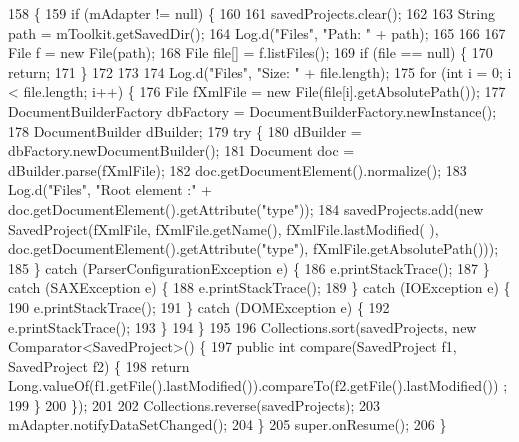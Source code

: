 \begin{DoxyCode}
158                            \{
159         \textcolor{keywordflow}{if} (mAdapter != null) \{
160 
161             savedProjects.clear();
162 
163             String path = mToolkit.getSavedDir();
164             Log.d(\textcolor{stringliteral}{"Files"}, \textcolor{stringliteral}{"Path: "} + path);
165 
166 
167             File f = \textcolor{keyword}{new} File(path);
168             File file[] = f.listFiles();
169             \textcolor{keywordflow}{if} (file == null) \{
170                 \textcolor{keywordflow}{return};
171             \}
172 
173 
174             Log.d(\textcolor{stringliteral}{"Files"}, \textcolor{stringliteral}{"Size: "} + file.length);
175             \textcolor{keywordflow}{for} (\textcolor{keywordtype}{int} i = 0; i < file.length; i++) \{
176                 File fXmlFile = \textcolor{keyword}{new} File(file[i].getAbsolutePath());
177                 DocumentBuilderFactory dbFactory = DocumentBuilderFactory.newInstance();
178                 DocumentBuilder dBuilder;
179                 \textcolor{keywordflow}{try} \{
180                     dBuilder = dbFactory.newDocumentBuilder();
181                     Document doc = dBuilder.parse(fXmlFile);
182                     doc.getDocumentElement().normalize();
183                     Log.d(\textcolor{stringliteral}{"Files"}, \textcolor{stringliteral}{"Root element :"} + doc.getDocumentElement().getAttribute(\textcolor{stringliteral}{"type"}));
184                     savedProjects.add(\textcolor{keyword}{new} SavedProject(fXmlFile, fXmlFile.getName(), fXmlFile.lastModified(
      ), doc.getDocumentElement().getAttribute(\textcolor{stringliteral}{"type"}), fXmlFile.getAbsolutePath()));
185                 \} \textcolor{keywordflow}{catch} (ParserConfigurationException e) \{
186                     e.printStackTrace();
187                 \} \textcolor{keywordflow}{catch} (SAXException e) \{
188                     e.printStackTrace();
189                 \} \textcolor{keywordflow}{catch} (IOException e) \{
190                     e.printStackTrace();
191                 \} \textcolor{keywordflow}{catch} (DOMException e) \{
192                     e.printStackTrace();
193                 \}
194             \}
195 
196             Collections.sort(savedProjects, \textcolor{keyword}{new} Comparator<SavedProject>() \{
197                 \textcolor{keyword}{public} \textcolor{keywordtype}{int} compare(SavedProject f1, SavedProject f2) \{
198                     \textcolor{keywordflow}{return} Long.valueOf(f1.getFile().lastModified()).compareTo(f2.getFile().lastModified())
      ;
199                 \}
200             \});
201 
202             Collections.reverse(savedProjects);
203             mAdapter.notifyDataSetChanged();
204         \}
205         super.onResume();
206     \}
\end{DoxyCode}
